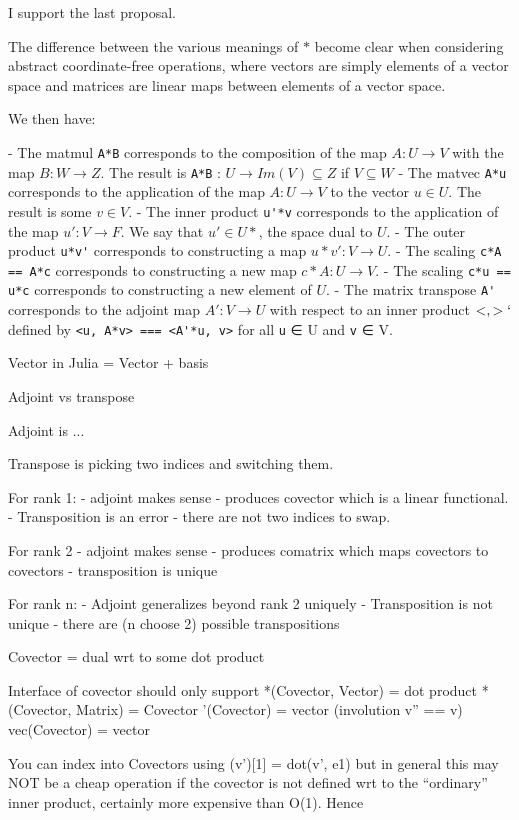 I support the last proposal.

The difference between the various meanings of $*$ become clear when considering abstract coordinate-free operations, where vectors are simply elements of a vector space and matrices are linear maps between elements of a vector space.

We then have:

- The matmul \verb`A*B` corresponds to the composition of the map $A : U \rightarrow V$ with the map $B : W \rightarrow Z$. The result is
  \verb`A*B` : $U \rightarrow Im(V) \subseteq Z$ if $V \subseteq W$
- The matvec \verb`A*u` corresponds to the application of the map $A : U \rightarrow V$ to the vector $u \in U$. The result is some $v \in V$.
- The inner product \verb`u'*v` corresponds to the application of the map $u' : V \rightarrow F$. We say that $u' \in U*$, the space dual to $U$.
- The outer product \verb`u*v'` corresponds to constructing a map $u*v' : V \rightarrow U$.
- The scaling \verb`c*A == A*c` corresponds to constructing a new map $c*A : U \rightarrow V$.
- The scaling \verb`c*u == u*c` corresponds to constructing a new element of $U$.
- The matrix transpose \verb`A'` corresponds to the adjoint map $A' : V \rightarrow U$ with respect to an inner product $< , >`$defined by
  \verb`<u, A*v> === <A'*u, v>` for all \verb`u` ∈ U and \verb`v` ∈ V.



Vector in Julia = Vector  + basis

Adjoint vs transpose

Adjoint is ...

Transpose is picking two indices and switching them.

For rank 1:
- adjoint makes sense - produces covector which is a linear functional.
- Transposition is an error - there are not two indices to swap.

For rank 2
- adjoint makes sense - produces comatrix which maps covectors to covectors
- transposition is unique

For rank n:
- Adjoint generalizes beyond rank 2 uniquely
- Transposition is not unique - there are (n choose 2) possible transpositions

Covector = dual wrt to some dot product

Interface of covector
should only support
*(Covector, Vector) = dot product
*(Covector, Matrix) = Covector
'(Covector) = vector (involution v'' == v)
vec(Covector) = vector

You can index into Covectors using (v')[1] = dot(v', e1) but in general this
may NOT be a cheap operation if the covector is not defined wrt to the
``ordinary'' inner product, certainly more expensive than O(1). Hence


